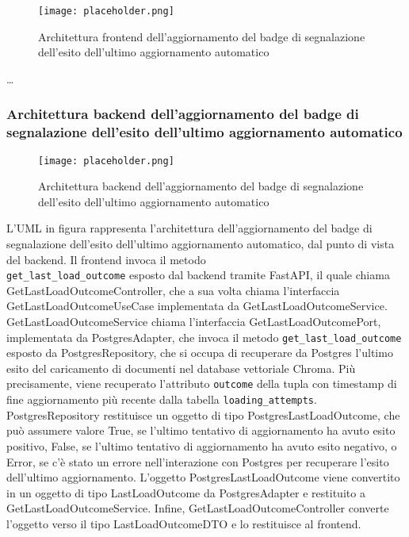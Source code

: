 \begin{figure}[h]
    \centering
    \texttt{[image: placeholder.png]}
    \caption{Architettura frontend dell’aggiornamento del badge di segnalazione dell’esito dell’ultimo aggiornamento automatico}
\end{figure}

\dots

\newpage


\subsubsection{Architettura backend dell’aggiornamento del badge di segnalazione dell’esito dell’ultimo aggiornamento automatico}
\label{sec:architettura_backend_badge_aggiornamento}

\begin{figure}[h]
    \centering
    \texttt{[image: placeholder.png]}
    \caption{Architettura backend dell’aggiornamento del badge di segnalazione dell’esito dell’ultimo aggiornamento automatico}
\end{figure}

L'UML in figura rappresenta l'architettura dell'aggiornamento del badge di segnalazione dell'esito dell'ultimo aggiornamento automatico, dal punto di vista del backend. Il frontend invoca il metodo\\ \texttt{get\_last\_load\_outcome} esposto dal backend tramite FastAPI, il quale chiama GetLastLoadOutcomeController, che a sua volta chiama l'interfaccia GetLastLoadOutcomeUseCase implementata da GetLastLoadOutcomeService. GetLastLoadOutcomeService chiama l'interfaccia GetLastLoadOutcomePort, implementata da PostgresAdapter, che invoca il metodo \texttt{get\_last\_load\_outcome} esposto da PostgresRepository, che si occupa di recuperare da Postgres l'ultimo esito del caricamento di documenti nel database vettoriale Chroma. Più precisamente, viene recuperato l'attributo \texttt{outcome} della tupla con timestamp di fine aggiornamento più recente dalla tabella \texttt{loading\_attempts}. PostgresRepository restituisce un oggetto di tipo PostgresLastLoadOutcome, che può assumere valore True, se l'ultimo tentativo di aggiornamento ha avuto esito positivo, False, se l'ultimo tentativo di aggiornamento ha avuto esito negativo, o Error, se c'è stato un errore nell'interazione con Postgres per recuperare l'esito dell'ultimo aggiornamento. L'oggetto PostgresLastLoadOutcome viene convertito in un oggetto di tipo LastLoadOutcome da PostgresAdapter e restituito a GetLastLoadOutcomeService. Infine, GetLastLoadOutcomeController converte l'oggetto verso il tipo LastLoadOutcomeDTO e lo restituisce al frontend.

